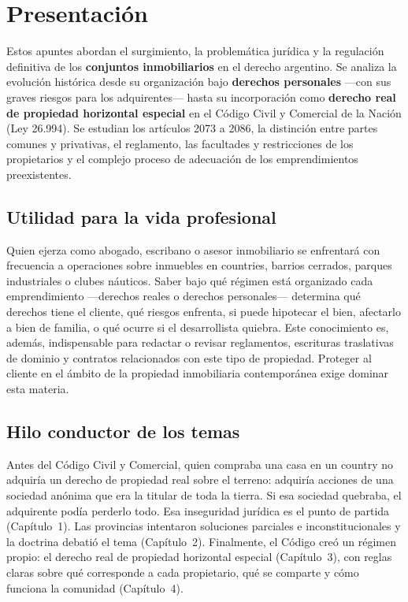 \documentclass[12pt,oneside]{book}
\begin{document}
\chapter*{Presentación}

Estos apuntes abordan el surgimiento, la problemática jurídica y la regulación definitiva de los \textbf{conjuntos inmobiliarios} en el derecho argentino. Se analiza la evolución histórica desde su organización bajo \textbf{derechos personales} ---con sus graves riesgos para los adquirentes--- hasta su incorporación como \textbf{derecho real de propiedad horizontal especial} en el Código Civil y Comercial de la Nación (Ley 26.994). Se estudian los artículos 2073 a 2086, la distinción entre partes comunes y privativas, el reglamento, las facultades y restricciones de los propietarios y el complejo proceso de adecuación de los emprendimientos preexistentes.

\section*{Utilidad para la vida profesional}

Quien ejerza como abogado, escribano o asesor inmobiliario se enfrentará con frecuencia a operaciones sobre inmuebles en countries, barrios cerrados, parques industriales o clubes náuticos. Saber bajo qué régimen está organizado cada emprendimiento ---derechos reales o derechos personales--- determina qué derechos tiene el cliente, qué riesgos enfrenta, si puede hipotecar el bien, afectarlo a bien de familia, o qué ocurre si el desarrollista quiebra. Este conocimiento es, además, indispensable para redactar o revisar reglamentos, escrituras traslativas de dominio y contratos relacionados con este tipo de propiedad. Proteger al cliente en el ámbito de la propiedad inmobiliaria contemporánea exige dominar esta materia.

\section*{Hilo conductor de los temas}

Antes del Código Civil y Comercial, quien compraba una casa en un country no adquiría un derecho de propiedad real sobre el terreno: adquiría acciones de una sociedad anónima que era la titular de toda la tierra. Si esa sociedad quebraba, el adquirente podía perderlo todo. Esa inseguridad jurídica es el punto de partida (Capítulo~1). Las provincias intentaron soluciones parciales e inconstitucionales y la doctrina debatió el tema (Capítulo~2). Finalmente, el Código creó un régimen propio: el derecho real de propiedad horizontal especial (Capítulo~3), con reglas claras sobre qué corresponde a cada propietario, qué se comparte y cómo funciona la comunidad (Capítulo~4).
\end{document}
